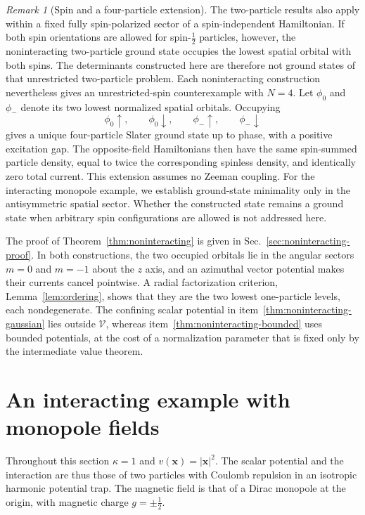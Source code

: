 \documentclass[11pt,a4paper]{article}
\theoremstyle{remark}
\newtheorem{remark}[theorem]{Remark}
\theoremstyle{plain}
\begin{document}
\begin{remark}[Spin and a four-particle extension]
\label{rem:spin}
The two-particle results also apply within a fixed fully spin-polarized
sector of a spin-independent Hamiltonian. If both spin orientations
are allowed for spin-$\tfrac12$ particles, however, the noninteracting
two-particle ground state occupies the lowest spatial orbital with
both spins. The determinants constructed here are therefore not ground
states of that unrestricted two-particle problem. 
Each noninteracting construction nevertheless gives an unrestricted-spin
counterexample with $N=4$. Let $\phi_0$ and $\phi_-$ denote its two lowest
normalized spatial orbitals. Occupying
\begin{equation*}
 \phi_0\uparrow,\qquad \phi_0\downarrow,\qquad
 \phi_-\uparrow,\qquad \phi_-\downarrow
\end{equation*}
gives a unique four-particle Slater ground state up to phase, with a
positive excitation gap. The opposite-field Hamiltonians then have
the same spin-summed particle density, equal to twice the corresponding
spinless density, and identically zero total current. This extension
assumes no Zeeman coupling. For the interacting monopole example, we
establish ground-state minimality only in the antisymmetric spatial
sector. Whether the constructed state remains a ground state when
arbitrary spin configurations are allowed is not addressed here.
\end{remark}

The proof of Theorem~\ref{thm:noninteracting} is given in
Sec.~\ref{sec:noninteracting-proof}. In
both constructions, the two occupied orbitals lie in the angular sectors $m=0$
and $m=-1$ about the $z$ axis, and an azimuthal vector potential makes
their currents cancel pointwise. A radial factorization criterion,
Lemma~\ref{lem:ordering}, shows that they are the two lowest
one-particle levels, each nondegenerate. The confining scalar potential in
item~\ref{thm:noninteracting-gaussian} lies outside $\mathcal V$,
whereas item~\ref{thm:noninteracting-bounded} uses bounded potentials,
at the cost of a normalization parameter that is fixed only by the
intermediate value theorem.

\section{An interacting example with monopole fields}
\label{sec:monopole}

Throughout this section $\kappa=1$ and $v(\mathbf x)=|\mathbf x|^2$.
The scalar potential and the interaction are thus those of two
particles with Coulomb repulsion in an isotropic harmonic potential trap. The
magnetic field is that of a Dirac monopole \cite{Dirac1931} at the
origin, with magnetic charge $g=\pm\tfrac12$.
\end{document}

